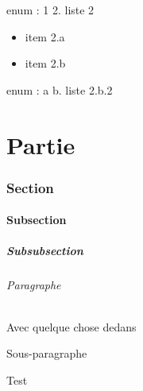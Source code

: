 \documentclass{article}
\begin{document}
			

enum : 1
			2. liste 2

			\begin{itemize}[label=$\bullet$]
				\item item 2.a
				\item item 2.b
			\end{itemize}

enum : a
			b. liste 2.b.2

			

	\part{Partie}

		\section{Section}

			\subsection{Subsection}

				\subsubsection{Subsubsection}

					\paragraph{Paragraphe}%
						Avec quelque chose dedans

						\subparagraph{Sous-paragraphe}%
							Test
\end{document}
